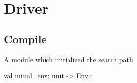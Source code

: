 \section{Driver}

\subsection{Compile}
A module which  initialized the search path



\begin{ocamlcode}
val initial_env: unit -> Env.t
\end{ocamlcode}
